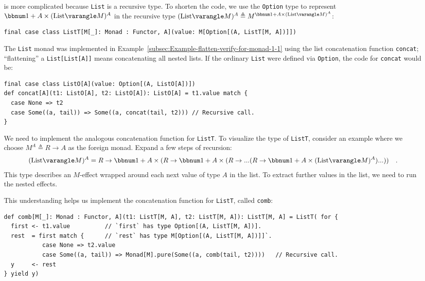 is more complicated because \lstinline!List! is a recursive type.
To shorten the code, we use the \lstinline!Option! type to represent
$\bbnum 1+A\times(\text{List}\varangle M)^{A}$ in the recursive type
$(\text{List}\varangle M)^{A}\triangleq M^{\bbnum 1+A\times(\text{List}\varangle M)^{A}}$:
\begin{lstlisting}
final case class ListT[M[_]: Monad : Functor, A](value: M[Option[(A, ListT[M, A])]])
\end{lstlisting}
The \lstinline!List! monad was implemented in Example~\ref{subsec:Example-flatten-verify-for-monad-1-1}
using the list concatenation function \lstinline!concat!; \textsf{``}flattening\textsf{''}
a \lstinline!List[List[A]]! means concatenating all nested lists.
If the ordinary \lstinline!List! were defined via \lstinline!Option!,
the code for \lstinline!concat! would be:
\begin{lstlisting}
final case class ListO[A](value: Option[(A, ListO[A])])
def concat[A](t1: ListO[A], t2: ListO[A]): ListO[A] = t1.value match {
  case None => t2
  case Some((a, tail)) => Some((a, concat(tail, t2))) // Recursive call.
}
\end{lstlisting}
We need to implement the analogous concatenation function for \lstinline!ListT!.
To visualize the type of \lstinline!ListT!, consider an example where
we choose $M^{A}\triangleq R\rightarrow A$ as the foreign monad.
Expand a few steps of recursion:
\[
(\text{List}\varangle M)^{A}=R\rightarrow\bbnum 1+A\times(R\rightarrow\bbnum 1+A\times(R\rightarrow...(R\rightarrow\bbnum 1+A\times(\text{List}\varangle M)^{A})...))\quad.
\]
This type describes an $M$-effect wrapped around each next value
of type $A$ in the list. To extract further values in the list, we
need to run the nested effects.

This understanding helps us implement the concatenation function for
\lstinline!ListT!, called \lstinline!comb!:
\begin{lstlisting}
def comb[M[_]: Monad : Functor, A](t1: ListT[M, A], t2: ListT[M, A]): ListT[M, A] = ListT( for {
  first <- t1.value          // `first` has type Option[(A, ListT[M, A])].
  rest  = first match {      // `rest` has type M[Option[(A, ListT[M, A])]]`.
           case None => t2.value
           case Some((a, tail)) => Monad[M].pure(Some((a, comb(tail, t2))))   // Recursive call.
  y     <- rest
} yield y)
\end{lstlisting}

